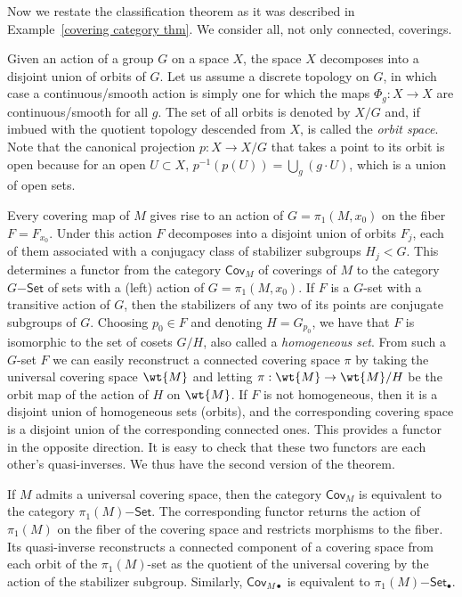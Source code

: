 Now we restate the classification theorem as it was described in Example~\ref{covering category thm}. We consider all, not only connected, coverings. 

Given an action of a group $G$ on a space $X$, the space $X$ decomposes into a disjoint union of orbits of $G$. Let us assume a discrete topology on $G$, in which case a continuous/smooth action is simply one for which the maps $\Phi_g:X\to X$ are continuous/smooth for all $g$. The set of all orbits is denoted by $X\slash G$ and, if imbued with the quotient topology descended from $X$, is called the \emph{orbit space}. Note that the canonical projection $p:X\to X\slash G$ that takes a point to its orbit is open because for an open $U\subset X$, $p^{-1}(p(U))=\bigcup_g (g\cdot U)$, which is a union of open sets.

Every covering map of $M$ gives rise to an action of $G=\pi_1(M,x_0)$ on the fiber $F=F_{x_0}$. Under this action $F$ decomposes into a disjoint union of orbits $F_j$, each of them associated with a conjugacy class of stabilizer subgroups $H_j<G$. This determines a functor from the category $\mathsf{Cov}_M$ of coverings of $M$ to the category $G\mathsf{-Set}$ of sets with a (left) action of $G=\pi_1(M,x_0)$. If $F$ is a $G$-set with a transitive action of $G$, then the stabilizers of any two of its points are conjugate subgroups of $G$. Choosing $p_0\in F$ and denoting $H=G_{p_0}$, we have that $F$ is isomorphic to the set of cosets $G\slash H$, also called a \emph{homogeneous set}. From such a $G$-set $F$ we can easily reconstruct a connected covering space $\pi$ by taking the universal covering space $\wt{M}$ and letting $\pi:\wt{M}\to \wt{M}\slash H$ be the orbit map of the action of $H$ on $\wt{M}$. If $F$ is not homogeneous, then it is a disjoint union of homogeneous sets (orbits), and the corresponding covering space is a disjoint union of the corresponding connected ones. This provides a functor in the opposite direction. It is easy to check that these two functors are each other's quasi-inverses. We thus have the second version of the theorem.

\begin{thm}\label{covering spaces category equivalence thm}
    If $M$ admits a universal covering space, then the category $\mathsf{Cov}_M$ is equivalent to the category $\pi_1(M)\mathsf{-Set}$. The corresponding functor returns the action of $\pi_1(M)$ on the fiber of the covering space and restricts morphisms to the fiber. Its quasi-inverse reconstructs a connected component of a covering space from each orbit of the $\pi_1(M)$-set as the quotient of the universal covering by the action of the stabilizer subgroup. Similarly, $\mathsf{Cov}_{M\bullet}$ is equivalent to $\pi_1(M)\mathsf{-Set}_\bullet$.
\end{thm}

